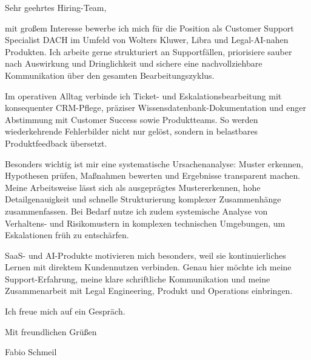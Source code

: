 \documentclass{atscv}
\begin{document}
\makecvheader

Sehr geehrtes Hiring-Team,

mit großem Interesse bewerbe ich mich für die Position als Customer Support Specialist DACH im Umfeld von Wolters Kluwer, Libra und Legal-AI-nahen Produkten. Ich arbeite gerne strukturiert an Supportfällen, priorisiere sauber nach Auswirkung und Dringlichkeit und sichere eine nachvollziehbare Kommunikation über den gesamten Bearbeitungszyklus.

Im operativen Alltag verbinde ich Ticket- und Eskalationsbearbeitung mit konsequenter CRM-Pflege, präziser Wissensdatenbank-Dokumentation und enger Abstimmung mit Customer Success sowie Produktteams. So werden wiederkehrende Fehlerbilder nicht nur gelöst, sondern in belastbares Produktfeedback übersetzt.

Besonders wichtig ist mir eine systematische Ursachenanalyse: Muster erkennen, Hypothesen prüfen, Maßnahmen bewerten und Ergebnisse transparent machen. Meine Arbeitsweise lässt sich als ausgeprägtes Mustererkennen, hohe Detailgenauigkeit und schnelle Strukturierung komplexer Zusammenhänge zusammenfassen. Bei Bedarf nutze ich zudem systemische Analyse von Verhaltens- und Risikomustern in komplexen technischen Umgebungen, um Eskalationen früh zu entschärfen.

SaaS- und AI-Produkte motivieren mich besonders, weil sie kontinuierliches Lernen mit direktem Kundennutzen verbinden. Genau hier möchte ich meine Support-Erfahrung, meine klare schriftliche Kommunikation und meine Zusammenarbeit mit Legal Engineering, Produkt und Operations einbringen.

Ich freue mich auf ein Gespräch.

Mit freundlichen Grüßen

Fabio Schmeil
\end{document}
